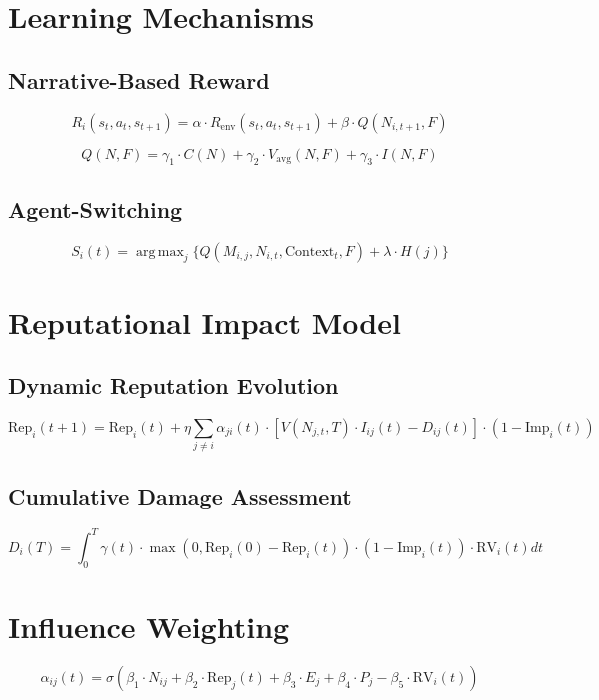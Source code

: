 \documentclass[12pt, a4paper]{article}
\DeclareMathOperator*{\argmax}{arg\,max}
\begin{document}
\section{Learning Mechanisms}

\subsection{Narrative-Based Reward}
\begin{equation}
R_i(s_t, a_t, s_{t+1}) = \alpha \cdot R_{\text{env}}(s_t, a_t, s_{t+1}) + \beta \cdot Q(N_{i,t+1}, F)
\end{equation}

\begin{equation}
Q(N, F) = \gamma_1 \cdot C(N) + \gamma_2 \cdot V_{\text{avg}}(N, F) + \gamma_3 \cdot I(N, F)
\end{equation}

\subsection{Agent-Switching}
\begin{equation}
S_i(t) = \argmax_j \{Q(M_{i,j}, N_{i,t}, \text{Context}_t, F) + \lambda \cdot H(j)\}
\end{equation}


\section{Reputational Impact Model}

\subsection{Dynamic Reputation Evolution}
\begin{equation}
\text{Rep}_i(t+1) = \text{Rep}_i(t) + \eta \sum_{j\neq i} \alpha_{ji}(t) \cdot [V(N_{j,t}, T) \cdot I_{ij}(t) - D_{ij}(t)] \cdot (1 - \text{Imp}_i(t))
\end{equation}

\subsection{Cumulative Damage Assessment}
\begin{equation}
D_i(T) = \int_0^T \gamma(t) \cdot \max(0, \text{Rep}_i(0) - \text{Rep}_i(t)) \cdot (1 - \text{Imp}_i(t)) \cdot \text{RV}_i(t) dt
\end{equation}


\section{Influence Weighting}
\begin{equation}
\alpha_{ij}(t) = \sigma(\beta_1 \cdot N_{ij} + \beta_2 \cdot \text{Rep}_j(t) + \beta_3 \cdot E_j + \beta_4 \cdot P_j - \beta_5 \cdot \text{RV}_i(t))
\end{equation}
\end{document}
